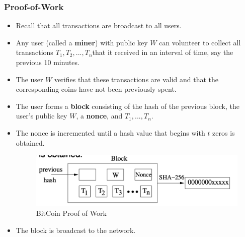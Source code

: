 \documentclass[12pt,titlepage]{article}
\begin{document}
\subsubsection{Proof-of-Work}
\begin{itemize}
	\item Recall that all transactions are broadcast to all users.
	\item Any user (called a \textbf{miner}) with public key $W$ can volunteer to collect all transactions $T_1, T_2, ..., T_n$that it received in an interval of time, say the previous 10 minutes.
	\item The user $W$ verifies that these transactions are valid and that the corresponding coins have not been previously spent.
	\item The user forms a \textbf{block} consisting of the hash of the previous block, the user’s public key $W$, a \textbf{nonce}, and $T_1,..., T_n$.
	\item The nonce is incremented until a hash value that begins with $t$ zeros is obtained.
	\begin{center}
		\begin{figure}[h!]
			\centering
			\includegraphics[width=.8\textwidth]{BitCoin_Proof_of_Work.png}
			\caption{BitCoin Proof of Work}
		\end{figure}
	\end{center}
	\item The block is broadcast to the network.
\end{itemize}
\end{document}
